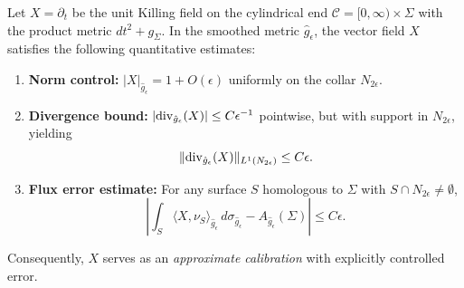 \begin{theorem}\label{thm:QuantitativeCalibration}
Let $X = \partial_t$ be the unit Killing field on the cylindrical end $\mathcal{C} = [0,\infty) \times \Sigma$ with the product metric $dt^2 + g_\Sigma$. In the smoothed metric $\hat{g}_\epsilon$, the vector field $X$ satisfies the following quantitative estimates:
\begin{enumerate}
    \item \textbf{Norm control:} $|X|_{\hat{g}_\epsilon} = 1 + O(\epsilon)$ uniformly on the collar $N_{2\epsilon}$.
    \item \textbf{Divergence bound:} $|\mathrm{div}_{\hat{g}_\epsilon}(X)| \le C\epsilon^{-1}$ pointwise, but with support in $N_{2\epsilon}$, yielding
    \[
        \|\mathrm{div}_{\hat{g}_\epsilon}(X)\|_{L^1(N_{2\epsilon})} \le C\epsilon.
    \]
    \item \textbf{Flux error estimate:} For any surface $S$ homologous to $\Sigma$ with $S \cap N_{2\epsilon} \neq \emptyset$,
    \[
        \left| \int_S \langle X, \nu_S \rangle_{\hat{g}_\epsilon} \, d\sigma_{\hat{g}_\epsilon} - A_{\hat{g}_\epsilon}(\Sigma) \right| \le C\epsilon.
    \]
\end{enumerate}
Consequently, $X$ serves as an \emph{approximate calibration} with explicitly controlled error.
\end{theorem}


